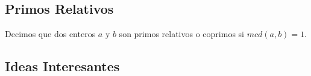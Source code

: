 \documentclass[12pt]{report}                                    %
\begin{document}
        \clearpage
        \subsection{Primos Relativos}

            Decimos que dos enteros $a$ y $b$ son primos relativos o coprimos si $mcd(a,b) = 1$.

        \subsection*{Ideas Interesantes}
\end{document}
